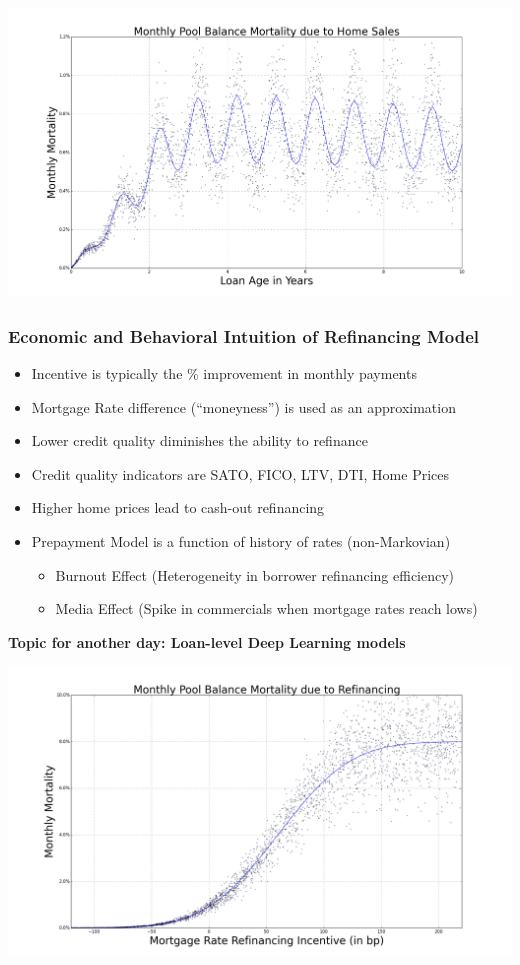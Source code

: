 \documentclass{beamer}
\begin{document}
\begin{frame}
\includegraphics[scale=0.26]{relo_by_age.png}
\end{frame}

\begin{frame}
\frametitle{Economic and Behavioral Intuition of Refinancing Model}
\begin{itemize}
\item Incentive is typically the \% improvement in monthly payments
\item Mortgage Rate difference (``moneyness'') is used as an approximation
\item Lower credit quality diminishes the ability to refinance
\item Credit quality indicators are SATO, FICO, LTV, DTI, Home Prices
\item Higher home prices lead to cash-out refinancing
\item Prepayment Model is a function of history of rates (non-Markovian)
\begin{itemize}
\item Burnout Effect (Heterogeneity in borrower refinancing efficiency)
\item Media Effect (Spike in commercials when mortgage rates reach lows)
\end{itemize}
\end{itemize}
{\bf Topic for another day: Loan-level Deep Learning models}
\end{frame}

\begin{frame}
\includegraphics[scale=0.26]{refi_scurve.png}
\end{frame}
\end{document}
